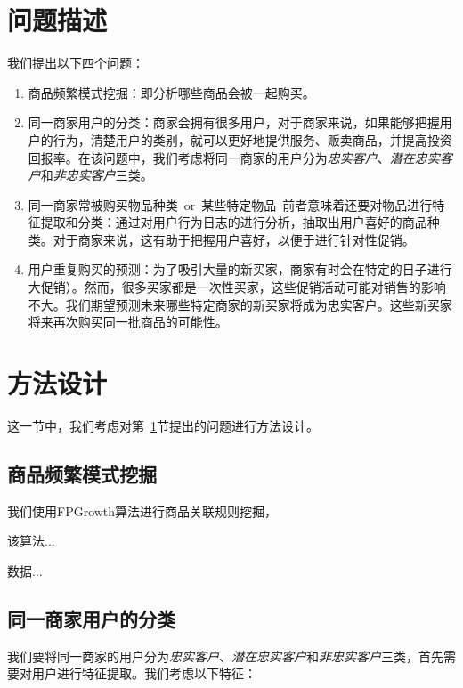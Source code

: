 \documentclass{acm_proc_article-sp}
\newcommand{\zap}[1]{}
\newcommand\TODO[1]{{\color{red}{Todo: #1}}}
\newcommand{\TBD}[1]{{\color{blue}#1}}
\begin{document}
\begin{spacing}{1.2}
\zap{
\category{H.4}{Information Systems Applications}{Miscellaneous}
\category{D.2.8}{Software Engineering}{Metrics}[complexity measures, performance measures]
}



\section{问题描述} %
\label{sec:problem}
我们提出以下四个问题：
\begin{enumerate}
  \item 商品频繁模式挖掘：即分析哪些商品会被一起购买。
  \item 同一商家用户的分类：商家会拥有很多用户，对于商家来说，如果能够把握用户的行为，清楚用户的类别，就可以更好地提供服务、贩卖商品，并提高投资回报率。在该问题中，我们考虑将同一商家的用户分为\emph{忠实客户}、\emph{潜在忠实客户}和\emph{非忠实客户}三类。
  \item 同一商家常被购买物品\TBD{种类\ or\ 某些特定物品\  前者意味着还要对物品进行特征提取和分类}：通过对用户行为日志的进行分析，抽取出用户喜好的商品种类。对于商家来说，这有助于把握用户喜好，以便于进行针对性促销。
  \item 用户重复购买的预测：为了吸引大量的新买家，商家有时会在特定的日子进行大促销）。然而，很多买家都是一次性买家，这些促销活动可能对销售的影响不大。我们期望预测未来哪些特定商家的新买家将成为忠实客户。这些新买家将来再次购买同一批商品的可能性。
\end{enumerate}

\section{方法设计}
这一节中，我们考虑对第~\ref{sec:problem}节提出的问题进行方法设计。
\subsection{商品频繁模式挖掘}
我们使用FPGrowth算法进行商品关联规则挖掘，

该算法...\TODO{算法review}

数据...\TODO{描述使用到的数据}

\subsection{同一商家用户的分类}
我们要将同一商家的用户分为\emph{忠实客户}、\emph{潜在忠实客户}和\emph{非忠实客户}三类，首先需要对用户进行特征提取。我们考虑以下特征：\TODO{给一个table}


\end{spacing}
\end{document}
